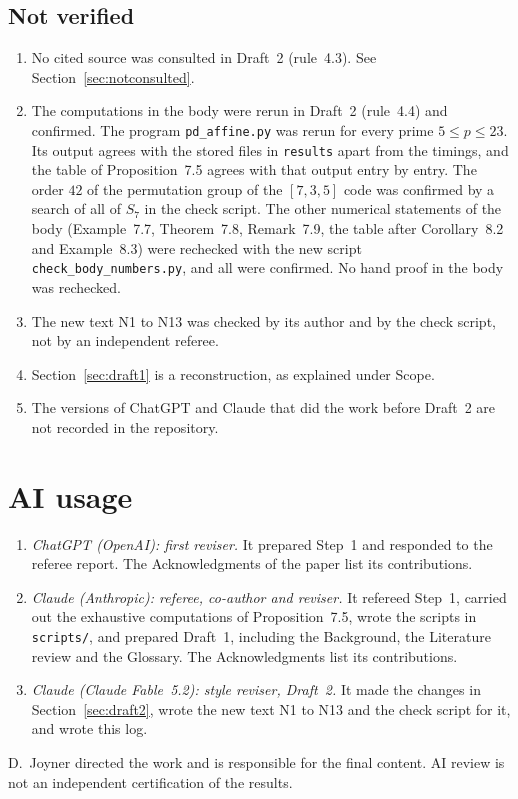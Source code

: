 \documentclass[12pt,letterpaper]{article}
\begin{document}
\subsection{Not verified}
\begin{enumerate}
\item No cited source was consulted in Draft~2 (rule~4.3). See
Section~\ref{sec:notconsulted}.
\item The computations in the body were rerun in Draft~2 (rule~4.4) and
confirmed. The program \texttt{pd\_affine.py} was rerun for every prime
$5\le p\le23$. Its output agrees with the stored files in \texttt{results}
apart from the timings, and the table of Proposition~7.5 agrees with that output
entry by entry. The order $42$ of the permutation group of the $[7,3,5]$ code was
confirmed by a search of all of $S_7$ in the check script. The other numerical
statements of the body (Example~7.7, Theorem~7.8, Remark~7.9, the table after
Corollary~8.2 and Example~8.3) were rechecked with the new script
\texttt{check\_body\_numbers.py}, and all were confirmed. No hand proof in
the body was rechecked.
\item The new text N1 to N13 was checked by its author and by the check script,
not by an independent referee.
\item Section~\ref{sec:draft1} is a reconstruction, as explained under Scope.
\item The versions of ChatGPT and Claude that did the work before Draft~2 are not
recorded in the repository.
\end{enumerate}

\section{AI usage}\label{sec:ai}
\begin{enumerate}
\item \emph{ChatGPT (OpenAI): first reviser.} It prepared Step~1 and responded to
the referee report. The Acknowledgments of the paper list its contributions.
\item \emph{Claude (Anthropic): referee, co-author and reviser.} It refereed
Step~1, carried out the exhaustive computations of Proposition~7.5, wrote the
scripts in \texttt{scripts/}, and prepared Draft~1, including the Background,
the Literature review and the Glossary. The Acknowledgments list its
contributions.
\item \emph{Claude (Claude Fable~5.2): style reviser, Draft~2.} It made the
changes in Section~\ref{sec:draft2}, wrote the new text N1 to N13 and the check script
for it, and wrote this log.
\end{enumerate}
D.~Joyner directed the work and is responsible for the final content. AI review is
not an independent certification of the results.
\end{document}

